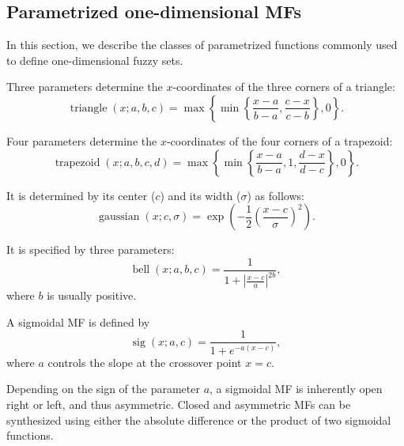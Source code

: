 
\subsection{Parametrized one-dimensional MFs}

In this section, we describe the classes of parametrized functions commonly used to define one-dimensional fuzzy sets.

\begin{definition}[Triangular MF] Three parameters determine the $x$-coordinates of the three corners of a triangle:
\[
\operatorname{triangle}(x;a,b,c) = \max \left\{ \min \left\{ \frac{x-a}{b-a},\frac{c-x}{c-b}  \right\}, 0\right\}.
\]

\end{definition}

\begin{definition}[Trapezoidal MF] Four parameters determine the $x$-coordinates of the four corners of a trapezoid:
\[
\operatorname{trapezoid}(x;a,b,c,d) = \max \left\{ \min \left\{ \frac{x-a}{b-a},1, \frac{d-x}{d-c}  \right\}, 0\right\}.
\]

\end{definition}

\begin{definition}[Gaussian MF] It is determined by its center ($c$) and its width ($\sigma$) as follows:
\[
\operatorname{gaussian}(x;c,\sigma) = \exp \left(-\frac{1}{2}\left( \frac{x-c}{\sigma} \right)^2\right).
\]

\end{definition}

\begin{definition} It is specified by three parameters:
\[
\operatorname{bell}(x;a,b,c) = \frac{1}{1 + \left| \frac{x-c}{a}\right|^{2b}},
\]
where $b$ is usually positive.

\end{definition}

\begin{definition}[Sigmoidal MF] A sigmoidal MF is defined by
\[
\operatorname{sig}(x;a,c) = \frac{1}{1 + e^{-a(x-c)}},
\]
where $a$ controls the slope at the crossover point $x=c$.

\end{definition}

\begin{remark} Depending on the sign of the parameter $a$, a sigmoidal MF is inherently open right or left, and thus asymmetric. Closed and asymmetric MFs can be synthesized using either the absolute difference or the product of two sigmoidal functions.

\end{remark}

